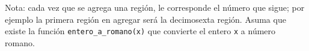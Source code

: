 Nota: cada vez que se agrega una región, le corresponde el número que sigue; por ejemplo la primera región en agregar será la decimosexta región. Asuma que existe la función \texttt{entero\_a\_romano(x)} que convierte el entero \texttt{x} a número romano.

